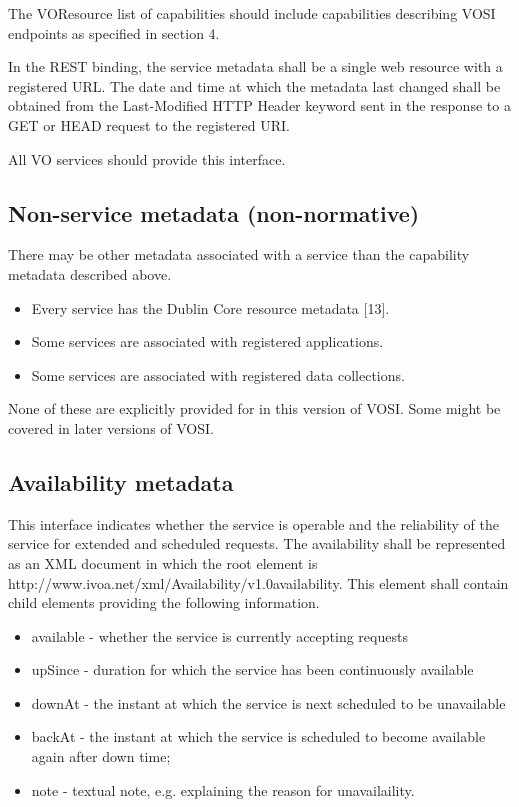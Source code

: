 \documentclass[11pt,letter]{ivoa}
\begin{document}
 The VOResource list of capabilities should include capabilities describing VOSI endpoints as specified in section 4.

In the REST binding, the service metadata shall be a single web resource with a registered URL. The date and time at which the metadata last changed shall be obtained from the Last-Modified HTTP Header keyword sent in the response to a GET or HEAD request to the registered URI.

All VO services should provide this interface. 

\subsection{Non-service metadata (non-normative)}

There may be other metadata associated with a service than the capability metadata described above.

\begin{itemize}
\item Every service has the Dublin Core resource metadata [13].
\item Some services are associated with registered applications.
\item Some services are associated with registered data collections. 
\end{itemize}

None of these are explicitly provided for in this version of VOSI. Some might be covered in later versions of VOSI. 

\subsection{Availability metadata}

This interface indicates whether the service is operable and the reliability of the service for extended and scheduled requests. The availability shall be represented as an XML document in which the root element is {http://www.ivoa.net/xml/Availability/v1.0}availability. This element shall contain child elements providing the following information.

\begin{itemize}
\item available - whether the service is currently accepting requests
\item upSince - duration for which the service has been continuously available
\item downAt - the instant at which the service is next scheduled to be unavailable
\item backAt - the instant at which the service is scheduled to become available again after down time;
\item note - textual note, e.g. explaining the reason for unavailaility. 
\end{itemize}
\end{document}
